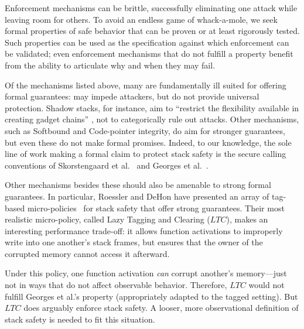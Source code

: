 \documentclass[10pt,conference]{ieeetran}%
\theoremstyle{definition}
\begin{document}
Enforcement mechanisms can be brittle, successfully eliminating one
attack while leaving room for others. To avoid an endless game of
whack-a-mole, we seek formal properties of safe behavior that can be
proven or at least rigorously tested. Such properties can be used as
the specification against which enforcement can be validated; even
enforcement mechanisms that do not fulfill a property benefit from the
ability to articulate why and when they may fail.

Of the mechanisms listed above, many are fundamentally ill suited for
offering formal guarantees: may impede attackers, but do not provide
universal protection. Shadow stacks, for instance, aim to ``restrict
the flexibility available in creating gadget chains''
\cite{Shanbhogue+19}, not to categorically rule out attacks. Other
mechanisms, such as Softbound\cite{NagarakatteZMZ09} and Code-pointer
integrity\cite{Kuznetsov+14}, do aim for stronger guarantees, but even
these do not make formal promises.  Indeed, to our knowledge, the sole
line of work making a formal claim to protect stack safety is the
secure calling conventions of Skorstengaard et
al.~\cite{SkorstengaardSTKJFP} and Georges et
al.~\cite{Georges22:TempsDesCerises}.

Other mechanisms besides these should also be amenable to strong
formal guarantees.  In particular, Roessler and DeHon
\cite{DBLP:conf/sp/RoesslerD18} have presented an array of tag-based
micro-policies~\cite{pump_oakland2015} for stack safety that offer
strong guarantees.  Their most realistic micro-policy, called Lazy
Tagging and Clearing (\(LTC\)), makes an interesting performance
trade-off: it allows function activations to improperly write into one
another's stack frames, but ensures that the owner of the corrupted
memory cannot access it afterward.

Under this policy, one function activation {\em can} corrupt another's
memory---just not in ways that do not affect observable behavior.
Therefore, \(LTC\) would not fulfill Georges et al.'s property
(appropriately adapted to the tagged setting).  But \(LTC\) does
arguably enforce stack safety.  A looser, more observational
definition of stack safety is needed to fit this situation.
\end{document}
